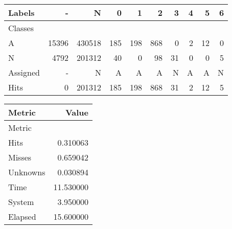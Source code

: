 \begin{tabular}{l|r|r|r|r|r|r|r|r|r}

Labels &      - &       N &    0 &    1 &    2 &   3 &  4 &   5 &  6 \\\hline
Classes  &        &         &      &      &      &     &    &     &    \\\hline
\hline
A        &  15396 &  430518 &  185 &  198 &  868 &   0 &  2 &  12 &  0 \\\hline
N        &   4792 &  201312 &   40 &    0 &   98 &  31 &  0 &   0 &  5 \\\hline
\hline
Assigned &      - &       N &    A &    A &    A &   N &  A &   A &  N \\\hline
Hits     &      0 &  201312 &  185 &  198 &  868 &  31 &  2 &  12 &  5 
\end{tabular}
\begin{tabular}{l|r}

Metric   &      Value \\\hline
Metric   &            \\\hline
\hline
Hits     &   0.310063 \\\hline
Misses   &   0.659042 \\\hline
Unknowns &   0.030894 \\\hline
Time     &  11.530000 \\\hline
System   &   3.950000 \\\hline
Elapsed  &  15.600000 
\end{tabular}
